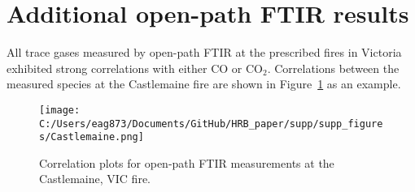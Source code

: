 \documentclass[acp, manuscript]{copernicus}
\begin{document}
\section{Additional open-path FTIR results}
All trace gases measured by open-path FTIR at the prescribed fires in Victoria exhibited strong correlations with either CO or CO$_2$. Correlations between the measured species at the Castlemaine fire are shown in Figure~\ref{fig:Castlemaine} as an example. 

\begin{figure}
  \texttt{[image: C:/Users/eag873/Documents/GitHub/HRB\_paper/supp/supp\_figures/Castlemaine.png]}
  \caption{Correlation plots for open-path FTIR measurements at the Castlemaine, VIC fire.}
  \label{fig:Castlemaine}
\end{figure}






\end{document}
